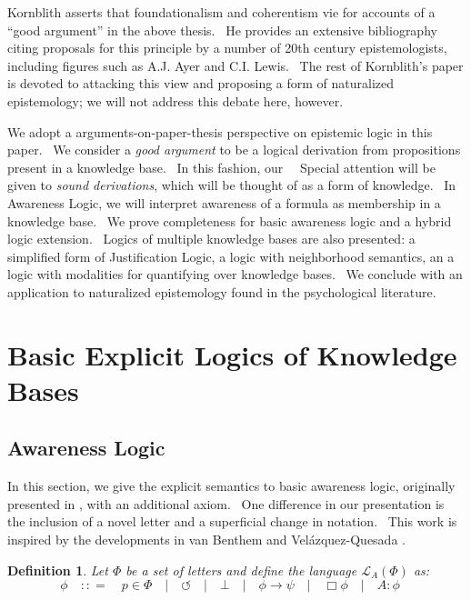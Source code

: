 \documentclass{acmconf}
\newcommand{\tmtextit}[1]{{\itshape{#1}}}
\newtheorem{definition}{Definition}
\begin{document}
Kornblith asserts that foundationalism and coherentism vie for accounts of a
``good argument'' in the above thesis. \ He provides an extensive bibliography
citing proposals for this principle by a number of 20th century
epistemologists, including figures such as A.J. Ayer and C.I. Lewis. \ The
rest of Kornblith's paper is devoted to attacking this view and proposing a
form of naturalized epistemology; we will not address this debate here,
however.



We adopt a arguments-on-paper-thesis perspective on epistemic logic in this
paper. \ We consider a \tmtextit{good argument} to be a logical derivation
from propositions present in a knowledge base. \ In this fashion, our \ \
Special attention will be given to \tmtextit{sound derivations}, which will be
thought of as a form of knowledge. \ In Awareness Logic, we will interpret
awareness of a formula as membership in a knowledge base. \ We prove
completeness for basic awareness logic and a hybrid logic extension. \ Logics
of multiple knowledge bases are also presented: a simplified form of
Justification Logic, a logic with neighborhood semantics, an a logic with
modalities for quantifying over knowledge bases. \ We conclude with an
application to naturalized epistemology found in the psychological literature.

\section{Basic Explicit Logics of Knowledge Bases}

\subsection{Awareness Logic\label{awarenesslogic}}

In this section, we give the explicit semantics to basic awareness logic,
originally presented in {\cite{fagin_belief_1987}}, with an additional axiom.
\ One difference in our presentation is the inclusion of a novel letter and a
superficial change in notation. \ This work is inspired by the developments in
van Benthem and Vel\'azquez-Quesada {\cite{van_benthem_inference_2009}}.

\begin{definition}
  Let $\Phi$ be a set of letters and define the language $\mathcal{L}_A
  (\Phi)$ as:
  \[ \phi \hspace{1em} : : = \hspace{1em} p \in \Phi \hspace{1em} |
     \hspace{1em} \circlearrowleft \hspace{1em} | \hspace{1em} \bot
     \hspace{1em} | \hspace{1em} \phi \rightarrow \psi \hspace{1em} |
     \hspace{1em} \Box \phi \hspace{1em} | \hspace{1em} A : \phi \hspace{1em}
  \]
\end{definition}
\end{document}
